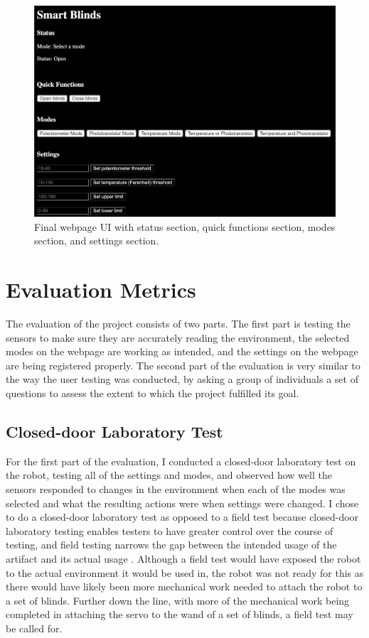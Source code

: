 \documentclass[10pt,twocolumn]{article}
\begin{document}
\begin{figure}
    \centering
    \includegraphics[width=.95\linewidth]{Figure 8.png}
    \caption{
        Final webpage UI with status section, quick functions section, modes section, and settings section.
    }
    \label{fig:fig8}
\end{figure}

\section{Evaluation Metrics}
The evaluation of the project consists of two parts. The first part is testing the sensors to make sure they are accurately reading the environment, the selected modes on the webpage are working as intended, and the settings on the webpage are being registered properly.  The second part of the evaluation is very similar to the way the user testing was conducted, by asking a group of individuals a set of questions to assess the extent to which the project fulfilled its goal.

\subsection{Closed-door Laboratory Test}
For the first part of the evaluation, I conducted a closed-door laboratory test on the robot, testing all of the settings and modes, and observed how well the sensors responded to changes in the environment when each of the modes was selected and what the resulting actions were when settings were changed. I chose to do a closed-door laboratory test as opposed to a field test because closed-door laboratory testing enables testers to have greater control over the course of testing, and field testing narrows the gap between the intended usage of the artifact and its actual usage \cite{Tan2016HCI}. Although a field test would have exposed the robot to the actual environment it would be used in, the robot was not ready for this as there would have likely been more mechanical work needed to attach the robot to a set of blinds. Further down the line, with more of the mechanical work being completed in attaching the servo to the wand of a set of blinds, a field test may be called for.
\end{document}
